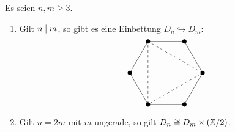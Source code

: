 \begin{proposition}
  Es seien $n, m \geq 3$.
  \begin{enumerate}
    \item
      Gilt $n \mathrel{|} m$, so gibt es eine Einbettung $D_n \hookrightarrow D_m$:
      \[
        \begin{tikzpicture}[scale=1.5]
          \draw (0:1)
          \foreach \x in {60, 120, ..., 360} {
            -- (\x:1)
          };
          \foreach \x in {60, 120, ..., 360} {
            \fill[black] (\x:1) circle (0.06);
          }
          \draw[dashed] (0:1)
          \foreach \x in {120, 240, 360} {
            -- (\x:1)
          };
        \end{tikzpicture}
      \]

    \item
      Gilt $n = 2m$ mit $m$ ungerade, so gilt $D_n \cong D_m \times (\mathbb{Z}/2)$.
  \end{enumerate}
\end{proposition}





